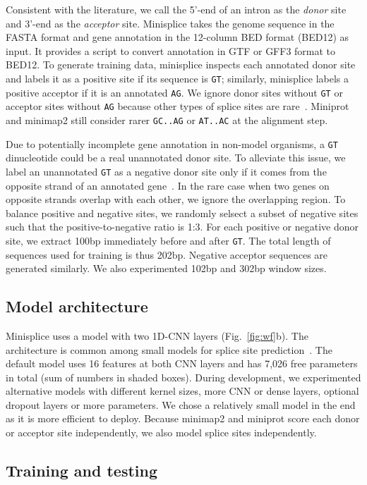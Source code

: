 \documentclass[webpdf,contemporary,large,namedate]{oup-authoring-template}%
\begin{document}
Consistent with the literature, we call the 5'-end of an intron as the \emph{donor} site
and 3'-end as the \emph{acceptor} site.
Minisplice takes the genome sequence in the FASTA format
and gene annotation in the 12-column BED format (BED12) as input.
It provides a script to convert annotation in GTF or GFF3 format to BED12.
To generate training data, minisplice inspects each annotated donor site and labels it as a positive site if its sequence is {\tt GT};
similarly, minisplice labels a positive acceptor if it is an annotated {\tt AG}.
We ignore donor sites without {\tt GT} or acceptor sites without {\tt AG}
because other types of splice sites are rare~\citep{Sibley:2016vh}.
Miniprot and minimap2 still consider rarer {\tt GC..AG} or {\tt AT..AC} at the alignment step.

Due to potentially incomplete gene annotation in non-model organisms,
a {\tt GT} dinucleotide could be a real unannotated donor site.
To alleviate this issue, we label an unannotated {\tt GT} as a negative donor site
only if it comes from the opposite strand of an annotated gene~\citep{Chao:2024aa}.
In the rare case when two genes on opposite strands overlap with each other,
we ignore the overlapping region.
To balance positive and negative sites,
we randomly selsect a subset of negative sites such that the positive-to-negative ratio is 1:3.
For each positive or negative donor site,
we extract 100bp immediately before and after {\tt GT}.
The total length of sequences used for training is thus 202bp.
Negative acceptor sequences are generated similarly.
We also experimented 102bp and 302bp window sizes.

\subsection{Model architecture}

Minisplice uses a model with two 1D-CNN layers (Fig.~\ref{fig:wf}b).
The architecture is common among small models for splice site prediction~\citep{Zabardast:2023aa}.
The default model uses 16 features at both CNN layers and has 7,026 free parameters in total (sum of numbers in shaded boxes).
During development, we experimented alternative models
with different kernel sizes, more CNN or dense layers, optional dropout layers or more parameters.
We chose a relatively small model in the end as it is more efficient to deploy.
Because minimap2 and miniprot score each donor or acceptor site independently,
we also model splice sites independently.

\subsection{Training and testing}
\end{document}
